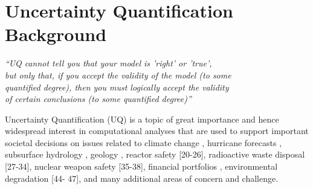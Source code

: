 

\chapter{Uncertainty Quantification Background}\label{cap:background}


\begin{flushright}
	\textit{``UQ cannot tell you that your model is 'right' or 'true', \\
	but only that, if you accept the validity of the model (to some \\
	quantified degree), then you must logically accept the validity\\
	of certain conclusions (to some quantified degree)''\\
	\cite{Sullivan2015}}
\end{flushright}

Uncertainty Quantification (UQ) is a topic of great importance and hence widespread interest in computational analyses that are used to support important societal decisions on issues related to climate change \cite{allen2000quantifying, patt2005taking}, hurricane forecasts \cite{Tobergte2013}, subsurface hydrology \cite{Baroni2014a}, geology \cite{Guerra2016}, reactor safety [20-26], radioactive waste disposal [27-34], nuclear weapon safety [35-38], financial portfolios \cite{Chen2008}, environmental degradation [44- 47], and many additional areas of concern and challenge.

